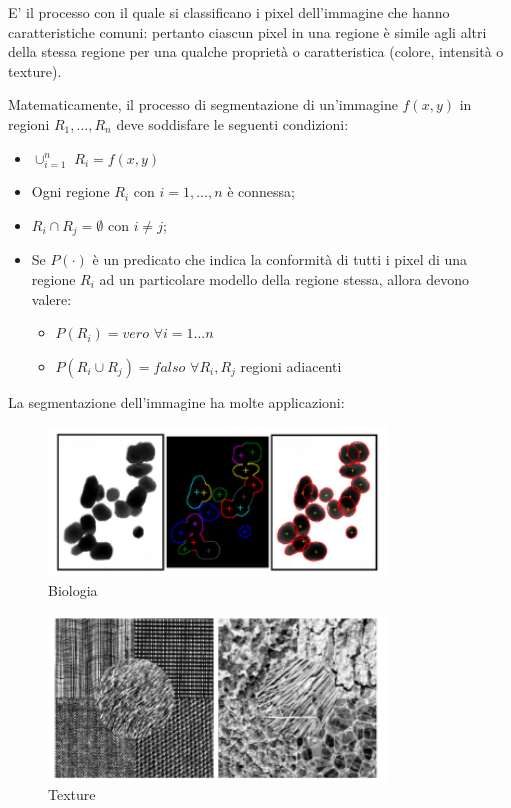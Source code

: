 \begin{definition}
    E' il processo con il quale si classificano i pixel dell'immagine che hanno
    caratteristiche comuni: pertanto ciascun pixel in una regione è simile agli
    altri della stessa regione per una qualche proprietà o caratteristica
    (colore, intensità o texture).
\end{definition}

Matematicamente, il processo di segmentazione di un'immagine $f(x,y)$ in regioni
$R_1,...,R_n$ deve soddisfare le seguenti condizioni:

\begin{itemize}
    \item $\cup^n_{i=1}$ $R_i = f(x,y)$
    \item Ogni regione $R_i$ con $i=1,...,n$ è connessa;
    \item $R_i \cap R_j = \emptyset$ con $i \neq j$;
    \item Se $P(\cdot)$ è un predicato che indica la conformità di tutti i pixel
          di una regione $R_i$ ad un particolare modello della regione stessa,
          allora devono valere:
          \begin{itemize}
              \item $P(R_i) = vero$ $\forall i = 1...n$
              \item $P(R_i \cup R_j) = falso$ $\forall R_i, R_j$ regioni
                    adiacenti
          \end{itemize}
\end{itemize}

La segmentazione dell'immagine ha molte applicazioni:


\begin{figure}[H]
    \centering
    \includegraphics[width=9cm, keepaspectratio]{capitoli/immagini/imgs/biologia.png}
    \caption{Biologia}
\end{figure}

\begin{figure}[H]
    \centering
    \includegraphics[width=9cm, keepaspectratio]{capitoli/immagini/imgs/texture.png}
    \caption{Texture}
\end{figure}

